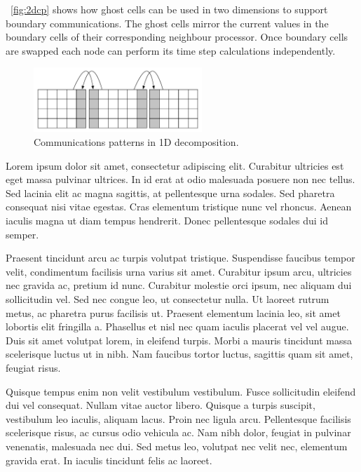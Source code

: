 \documentclass[10pt, a4paper, conference]{IEEEtran}
\begin{document}
\figurename~\ref{fig:2dcp} shows how ghost cells can be used in two dimensions to support boundary communications. The ghost cells mirror the current values in the boundary cells of their corresponding neighbour processor. Once boundary cells are swapped each node can perform its time step calculations independently.


\begin{figure} 
\centering 

\includegraphics[width=2.5in]{graphics/1d3x1comms.pdf}
    \caption{Communications patterns in 1D decomposition.}
    \label{fig:1dcp}
\end{figure}






Lorem ipsum dolor sit amet, consectetur adipiscing elit. Curabitur ultricies est eget massa pulvinar ultrices. In id erat at odio malesuada posuere non nec tellus. Sed lacinia elit ac magna sagittis, at pellentesque urna sodales. Sed pharetra consequat nisi vitae egestas. Cras elementum tristique nunc vel rhoncus. Aenean iaculis magna ut diam tempus hendrerit. Donec pellentesque sodales dui id semper.

Praesent tincidunt arcu ac turpis volutpat tristique. Suspendisse faucibus tempor velit, condimentum facilisis urna varius sit amet. Curabitur ipsum arcu, ultricies nec gravida ac, pretium id nunc. Curabitur molestie orci ipsum, nec aliquam dui sollicitudin vel. Sed nec congue leo, ut consectetur nulla. Ut laoreet rutrum metus, ac pharetra purus facilisis ut. Praesent elementum lacinia leo, sit amet lobortis elit fringilla a. Phasellus et nisl nec quam iaculis placerat vel vel augue. Duis sit amet volutpat lorem, in eleifend turpis. Morbi a mauris tincidunt massa scelerisque luctus ut in nibh. Nam faucibus tortor luctus, sagittis quam sit amet, feugiat risus.

Quisque tempus enim non velit vestibulum vestibulum. Fusce sollicitudin eleifend dui vel consequat. Nullam vitae auctor libero. Quisque a turpis suscipit, vestibulum leo iaculis, aliquam lacus. Proin nec ligula arcu. Pellentesque facilisis scelerisque risus, ac cursus odio vehicula ac. Nam nibh dolor, feugiat in pulvinar venenatis, malesuada nec dui. Sed metus leo, volutpat nec velit nec, elementum gravida erat. In iaculis tincidunt felis ac laoreet.
\end{document}
